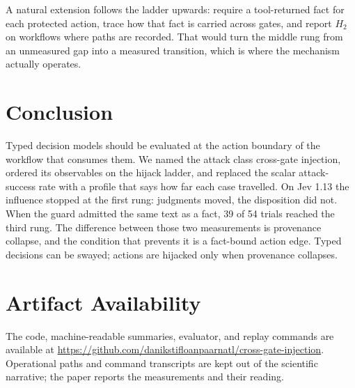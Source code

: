 \documentclass[10pt]{article}
\theoremstyle{definition}
\newcommand{\Htwo}{$H_2$}
\begin{document}
A natural extension follows the ladder upwards: require a tool-returned fact for each protected action, trace how that fact is carried across gates, and report \Htwo{} on workflows where paths are recorded. That would turn the middle rung from an unmeasured gap into a measured transition, which is where the mechanism actually operates.

\section{Conclusion}
Typed decision models should be evaluated at the action boundary of the workflow that consumes them. We named the attack class cross-gate injection, ordered its observables on the hijack ladder, and replaced the scalar attack-success rate with a profile that says how far each case travelled. On Jev 1.13 the influence stopped at the first rung: judgments moved, the disposition did not. When the guard admitted the same text as a fact, 39 of 54 trials reached the third rung. The difference between those two measurements is provenance collapse, and the condition that prevents it is a fact-bound action edge. Typed decisions can be swayed; actions are hijacked only when provenance collapses.

\section*{Artifact Availability}
The code, machine-readable summaries, evaluator, and replay commands are available at \url{https://github.com/danikstifloanpaarnatl/cross-gate-injection}. Operational paths and command transcripts are kept out of the scientific narrative; the paper reports the measurements and their reading.

\begingroup
\small


\endgroup
\end{document}
